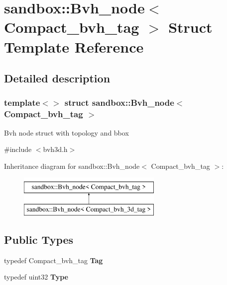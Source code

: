\hypertarget{structsandbox_1_1_bvh__node_3_01_compact__bvh__tag_01_4}{}\section{sandbox\+:\+:Bvh\+\_\+node$<$ Compact\+\_\+bvh\+\_\+tag $>$ Struct Template Reference}
\label{structsandbox_1_1_bvh__node_3_01_compact__bvh__tag_01_4}


\subsection{Detailed description}
\subsubsection*{template$<$$>$\newline
struct sandbox\+::\+Bvh\+\_\+node$<$ Compact\+\_\+bvh\+\_\+tag $>$}

Bvh node struct with topology and bbox 

{\ttfamily \#include $<$bvh3d.\+h$>$}

Inheritance diagram for sandbox\+:\+:Bvh\+\_\+node$<$ Compact\+\_\+bvh\+\_\+tag $>$\+:\begin{figure}[H]
\begin{center}
\leavevmode
\includegraphics[height=2.000000cm]{structsandbox_1_1_bvh__node_3_01_compact__bvh__tag_01_4}
\end{center}
\end{figure}
\subsection*{Public Types}
\begin{DoxyCompactItemize}
\item 
\mbox{\label{structsandbox_1_1_bvh__node_3_01_compact__bvh__tag_01_4_af3fca835972627b29003d328ea8f60da}} 
typedef Compact\+\_\+bvh\+\_\+tag {\bfseries Tag}
\item 
\mbox{\label{structsandbox_1_1_bvh__node_3_01_compact__bvh__tag_01_4_a701018d976f7e60e60256ab2eb5a38d1}} 
typedef uint32 {\bfseries Type}
\end{DoxyCompactItemize}
